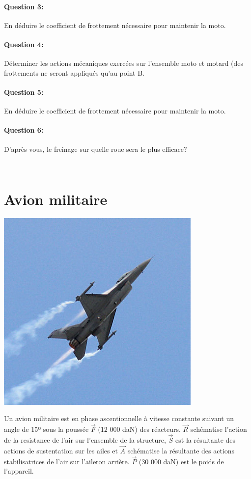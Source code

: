 \paragraph{Question 3:} En déduire le coefficient de frottement nécessaire pour maintenir la moto.

\paragraph{Question 4:} Déterminer les actions mécaniques exercées sur l'ensemble moto et motard (des frottements ne seront appliqués qu'au point B.

\paragraph{Question 5:} En déduire le coefficient de frottement nécessaire pour maintenir la moto.

\paragraph{Question 6:} D'après vous, le freinage sur quelle roue sera le plus efficace?


\newpage

~\

\newpage

\section{Avion militaire}

\begin{minipage}{0.4\linewidth}
 \centering\includegraphics[width=0.7\linewidth]{img/avion_chasse.jpg}
\end{minipage}
\hfill
\begin{minipage}{0.56\linewidth}
Un avion militaire est en phase ascentionnelle à vitesse constante suivant un angle de 15º sous la poussée $\overrightarrow{F}$ (12 000 daN) des réacteurs. $\overrightarrow{R}$ schématise l'action de la resistance de l'air sur l'ensemble de la structure, $\overrightarrow{S}$ est la résultante des actions de sustentation sur les ailes et $\overrightarrow{A}$ schématise la résultante des actions stabilisatrices de l'air sur l'aileron arrière. $\overrightarrow{P}$ (30 000 daN) est le poids de l'appareil.
\end{minipage}

